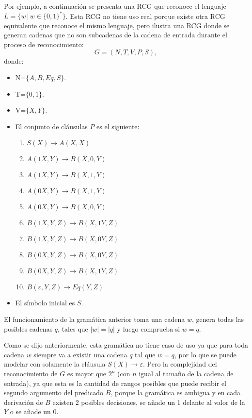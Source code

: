 Por ejemplo, a continuación se presenta una RCG que reconoce el lenguaje $L=\{w\,|\,w\in\{0,1\}^*\}$. Esta RCG no tiene uso real porque existe otra RCG equivalente que reconoce el
mismo lenguaje, pero ilustra una RCG donde se generan cadenas que no son subcadenas de la cadena de entrada durante el proceso
de reconocimiento:
\[
    G = (N, T, V, P, S),
\]
donde:

\begin{itemize}
    \item  N=$\{A,B,Eq,S\}$.
    \item T=$\{0,1\}$.
    \item V=$\{X,Y\}$.
    \item El conjunto de cláusulas $P$ es el siguiente:
          \begin{enumerate}
              \item $S(X)\to A(X,X)$
              \item $A(1X,Y)\to B(X,0,Y)$
              \item $A(1X,Y)\to B(X,1,Y)$
              \item $A(0X,Y)\to B(X,1,Y)$
              \item $A(0X,Y)\to B(X,0,Y)$
              \item $B(1X,Y,Z)\to B(X,1Y,Z)$
              \item $B(1X,Y,Z)\to B(X,0Y,Z)$
              \item $B(0X,Y,Z)\to B(X,0Y,Z)$
              \item $B(0X,Y,Z)\to B(X,1Y,Z)$
              \item $B(\varepsilon,Y,Z)\to Eq(Y,Z)$
          \end{enumerate}
          
    \item El símbolo inicial es $S$.
\end{itemize}

El funcionamiento de la gramática anterior toma una cadena $w$, genera todas las posibles cadenas $q$, tales que 
$|w|=|q|$ y luego comprueba si $w = q$.

Como se dijo anteriormente, esta gramática no tiene caso de uso ya que para toda cadena $w$ siempre va a existir 
una cadena $q$ tal que $w=q$, por lo que se puede modelar con solamente la cláusula $S(X)\to \varepsilon$. 
Pero la complejidad del reconocimiento de $G$ es mayor que $2^n$ (con $n$ igual al tamaño de la cadena de entrada), 
ya que esta es la cantidad de rangos posibles que puede recibir el segundo argumento  del predicado $B$, porque la gramática es ambigua y en cada derivación de $B$ existen 2 posibles decisiones, se añade un 1 delante al valor de la $Y$ o se añade un $0$. 


